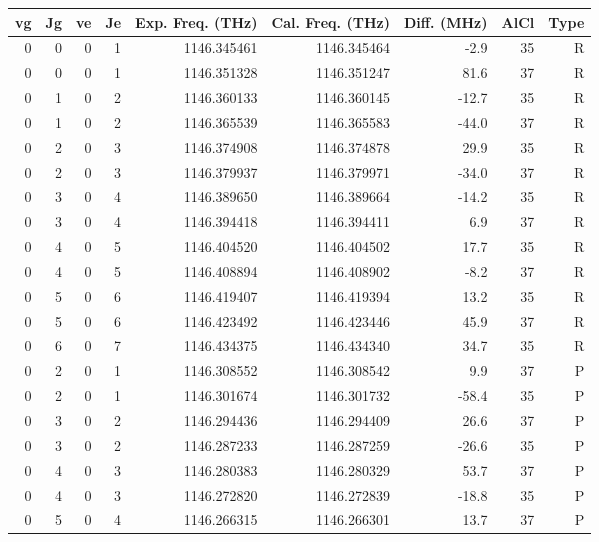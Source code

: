 \begin{table}
\begin{tabu}{rrrrrrrrr}
\toprule
vg & Jg & ve & Je & Exp. Freq. (THz) & Cal. Freq. (THz) & Diff. (MHz) & AlCl & Type\\ \midrule 
\rowfont{\color{red}}0 & 0 & 0 & 1 & 1146.345461 & 1146.345464 & -2.9 & 35 & R\\
\rowfont{\color{red}}0 & 0 & 0 & 1 & 1146.351328 & 1146.351247 & 81.6 & 37 & R\\
\rowfont{\color{red}}0 & 1 & 0 & 2 & 1146.360133 & 1146.360145 & -12.7 & 35 & R\\
\rowfont{\color{red}}0 & 1 & 0 & 2 & 1146.365539 & 1146.365583 & -44.0 & 37 & R\\
\rowfont{\color{red}}0 & 2 & 0 & 3 & 1146.374908 & 1146.374878 & 29.9 & 35 & R\\
\rowfont{\color{red}}0 & 2 & 0 & 3 & 1146.379937 & 1146.379971 & -34.0 & 37 & R\\
\rowfont{\color{red}}0 & 3 & 0 & 4 & 1146.389650 & 1146.389664 & -14.2 & 35 & R\\
\rowfont{\color{red}}0 & 3 & 0 & 4 & 1146.394418 & 1146.394411 & 6.9 & 37 & R\\
\rowfont{\color{red}}0 & 4 & 0 & 5 & 1146.404520 & 1146.404502 & 17.7 & 35 & R\\
\rowfont{\color{red}}0 & 4 & 0 & 5 & 1146.408894 & 1146.408902 & -8.2 & 37 & R\\
\rowfont{\color{red}}0 & 5 & 0 & 6 & 1146.419407 & 1146.419394 & 13.2 & 35 & R\\
\rowfont{\color{red}}0 & 5 & 0 & 6 & 1146.423492 & 1146.423446 & 45.9 & 37 & R\\
\rowfont{\color{red}}0 & 6 & 0 & 7 & 1146.434375 & 1146.434340 & 34.7 & 35 & R\\
\rowfont{\color{blue}}0 & 2 & 0 & 1 & 1146.308552 & 1146.308542 & 9.9 & 37 & P\\
\rowfont{\color{blue}}0 & 2 & 0 & 1 & 1146.301674 & 1146.301732 & -58.4 & 35 & P\\
\rowfont{\color{blue}}0 & 3 & 0 & 2 & 1146.294436 & 1146.294409 & 26.6 & 37 & P\\
\rowfont{\color{blue}}0 & 3 & 0 & 2 & 1146.287233 & 1146.287259 & -26.6 & 35 & P\\
\rowfont{\color{blue}}0 & 4 & 0 & 3 & 1146.280383 & 1146.280329 & 53.7 & 37 & P\\
\rowfont{\color{blue}}0 & 4 & 0 & 3 & 1146.272820 & 1146.272839 & -18.8 & 35 & P\\
\rowfont{\color{blue}}0 & 5 & 0 & 4 & 1146.266315 & 1146.266301 & 13.7 & 37 & P\\

\end{tabu}
\end{table}
